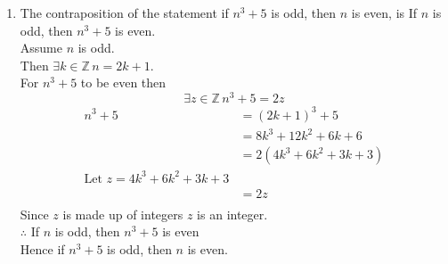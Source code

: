 \documentclass[12pt letter]{report}
\begin{document}

\begin{myproof}

	\begin{enumerate}
		\item
		      The contraposition of the statement if $n^3 + 5$ is odd, then $n$ is even, is If $n$ is odd, then $n^3 + 5$
		      is even.\\
		      Assume $n$ is odd.\\
		      Then $\exists k \in\mathbb{Z}\, n = 2k + 1$.\\
		      For $n^3 + 5$ to be even then
		      \[
			      \exists z \in \mathbb{Z} \, n^3 + 5 = 2z
		      \]
		      \begin{align*}
			      n^3 + 5 & = \left( 2k + 1 \right)^3 + 5            \\
			              & = 8k^3 + 12k^2 + 6k + 6                  \\
			              & = 2 \left( 4k^3 + 6k^2 + 3k + 3  \right) \\
			      \text{Let } z =  4k^3 + 6k^2 + 3k + 3              \\
			              & = 2z                                     \\
		      \end{align*}
		      Since $z$ is made up of integers $z$ is an integer.\\
		      $\therefore$ If $n$ is odd, then $n^3 + 5$ is even\\
		      Hence if $n^3 + 5$ is odd, then $n$ is even.


\end{enumerate}
\end{myproof}
\end{document}
